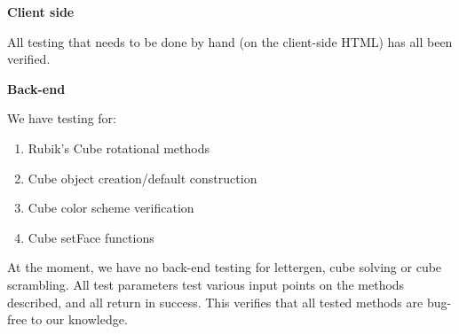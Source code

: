 \documentclass[12pt]{article}
\begin{document}
\par \textbf{Client side} \\
\par All testing that needs to be done by hand (on the client-side HTML) has all been verified. \\


\par \textbf{Back-end} \\
\par We have testing for: \\
\begin{enumerate}
\item Rubik’s Cube rotational methods
\item Cube object creation/default construction
\item Cube color scheme verification
\item Cube setFace functions
\end{enumerate}

\par At the moment, we have no back-end testing for lettergen, cube solving or cube scrambling. All test parameters test various input points on the methods described, and all return in success. This verifies that all tested methods are bug-free to our knowledge. \\
\end{document}
